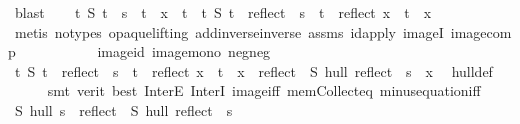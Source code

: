 \begin{isabellebody}
\ blast\isanewline
\ \ \isamarkupfalse%
\ {}{\isacharcolon}{\kern0pt}{\isachardoublequoteopen}{\isacharparenleft}{\kern0pt}{\isasymforall}t{\isachardot}{\kern0pt}\ S\ t\ {\isasymand}\ s\ {\isasymsubseteq}\ t\ {\isasymlongrightarrow}\ x\ {\isasymin}\ t{\isacharparenright}{\kern0pt}\ {\isasymlongleftrightarrow}\ {\isacharparenleft}{\kern0pt}{\isasymforall}t{\isachardot}{\kern0pt}\ S\ t\ {\isasymand}\ reflect\ {\isacharbackquote}{\kern0pt}\ s\ {\isasymsubseteq}\ t\ {\isasymlongrightarrow}\ reflect\ x\ {\isasymin}\ t{\isacharparenright}{\kern0pt}{\isachardoublequoteclose}\ \ x\ \isanewline
\ \ \ \ \isamarkupfalse%
\ {\isacharparenleft}{\kern0pt}metis\ {\isacharparenleft}{\kern0pt}no{\isacharunderscore}{\kern0pt}types{\isacharcomma}{\kern0pt}\ opaque{\isacharunderscore}{\kern0pt}lifting{\isacharparenright}{\kern0pt}\ add{\isachardot}{\kern0pt}inverse{\isacharunderscore}{\kern0pt}inverse\ assms\ id{\isacharunderscore}{\kern0pt}apply\ imageI\ image{\isacharunderscore}{\kern0pt}comp\ \ \ \isanewline
\ \ \ \ \ \ \ \ image{\isacharunderscore}{\kern0pt}id\ image{\isacharunderscore}{\kern0pt}mono\ neg{\isacharunderscore}{\kern0pt}neg{\isacharparenright}{\kern0pt}\isanewline
\ \ \isamarkupfalse%
\ {}{\isacharcolon}{\kern0pt}{\isachardoublequoteopen}{\isacharparenleft}{\kern0pt}{\isasymforall}t{\isachardot}{\kern0pt}\ S\ t\ {\isasymand}\ reflect\ {\isacharbackquote}{\kern0pt}\ s\ {\isasymsubseteq}\ t\ {\isasymlongrightarrow}\ reflect\ x\ {\isasymin}\ t{\isacharparenright}{\kern0pt}\ {\isasymlongleftrightarrow}\ {\isacharparenleft}{\kern0pt}x\ {\isasymin}\ reflect\ {\isacharbackquote}{\kern0pt}\ {\isacharparenleft}{\kern0pt}S\ hull\ {\isacharparenleft}{\kern0pt}reflect\ {\isacharbackquote}{\kern0pt}\ s{\isacharparenright}{\kern0pt}{\isacharparenright}{\kern0pt}{\isacharparenright}{\kern0pt}{\isachardoublequoteclose}\ \ x\ \isamarkupfalse%
\ hull{\isacharunderscore}{\kern0pt}def\isanewline
\ \ \ \ \isamarkupfalse%
\ {\isacharparenleft}{\kern0pt}smt\ {\isacharparenleft}{\kern0pt}verit{\isacharcomma}{\kern0pt}\ best{\isacharparenright}{\kern0pt}\ InterE\ InterI\ image{\isacharunderscore}{\kern0pt}iff\ mem{\isacharunderscore}{\kern0pt}Collect{\isacharunderscore}{\kern0pt}eq\ minus{\isacharunderscore}{\kern0pt}equation{\isacharunderscore}{\kern0pt}iff{\isacharparenright}{\kern0pt}\isanewline
\ \ \isamarkupfalse%
\ {\isachardoublequoteopen}{\isacharparenleft}{\kern0pt}S\ hull\ s{\isacharparenright}{\kern0pt}\ {\isacharequal}{\kern0pt}\ reflect\ {\isacharbackquote}{\kern0pt}\ {\isacharparenleft}{\kern0pt}S\ hull\ {\isacharparenleft}{\kern0pt}reflect\ {\isacharbackquote}{\kern0pt}\ s{\isacharparenright}{\kern0pt}{\isacharparenright}{\kern0pt}{\isachardoublequoteclose}\ \isamarkupfalse%

\end{isabellebody}
